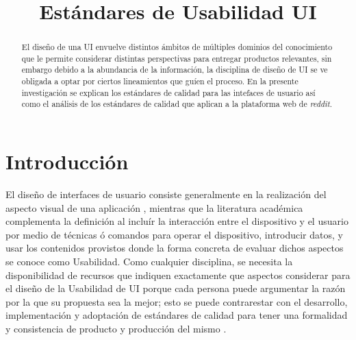 \title{Estándares de Usabilidad UI}

\author{
}

\maketitle

\begin{abstract}
El diseño de una UI envuelve distintos ámbitos de múltiples dominios del conocimiento
que le permite considerar distintas perspectivas para entregar productos relevantes, sin embargo
debido a la abundancia de la información, la disciplina de diseño de UI se ve obligada a optar
por ciertos lineamientos que guíen el proceso. En la presente investigación se explican 
los estándares de calidad para las intefaces de usuario así como el análisis de los 
estándares de calidad que aplican a la plataforma web de \emph{reddit}.
\end{abstract}

\section{Introducción}
El diseño de interfaces de usuario consiste generalmente en la realización del aspecto
visual de una aplicación \cite{unkunknown-author-no-dateB,geeksforgeeks-2022,unknown-author-no-dateA},
mientras que la literatura académica \cite{sharma-2021} complementa la definición
al incluír la interacción entre el dispositivo y el usuario por medio de técnicas 
ó comandos para operar el dispositivo, introducir datos, y usar los contenidos provistos
donde la forma concreta de evaluar dichos aspectos se conoce como Usabilidad.
Como cualquier disciplina, se necesita la disponibilidad de recursos que indiquen exactamente
que aspectos considerar para el diseño de la Usabilidad de UI porque cada persona puede argumentar la razón
por la que su propuesta sea la mejor; esto se puede contrarestar con el desarrollo, implementación
y adoptación de estándares de calidad para tener una formalidad y consistencia de producto y producción
del mismo \cite{bevan-2009}. %

